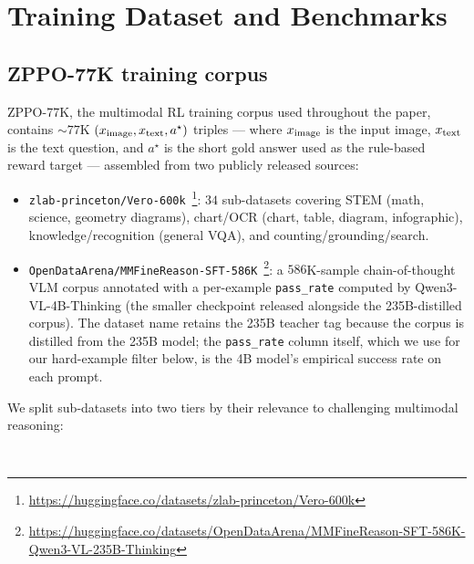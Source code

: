 \section{Training Dataset and Benchmarks}
\label{sec:appendix:dataset}

\subsection{ZPPO-77K training corpus}
\label{sec:appendix:dataset:corpus}

ZPPO-77K, the multimodal RL training corpus used throughout the paper, contains $\sim$$77$K $(x_{\rm image},x_{\rm text},a^{\star})$ triples --- where $x_{\rm image}$ is the input image, $x_{\rm text}$ is the text question, and $a^{\star}$ is the short gold answer used as the rule-based reward target --- assembled from two publicly released sources:
\begin{itemize}[leftmargin=12pt,topsep=2pt,itemsep=2pt]
    \item \texttt{zlab-princeton/Vero-600k}~\citep{sarch2026vero}\footnote{\url{https://huggingface.co/datasets/zlab-princeton/Vero-600k}}: $34$ sub-datasets covering STEM (math, science, geometry diagrams), chart/OCR (chart, table, diagram, infographic), knowledge/recognition (general VQA), and counting/grounding/search.
    \item \texttt{OpenDataArena/MMFineReason-SFT-586K}~\citep{lin2026mmfinereason}\footnote{\url{https://huggingface.co/datasets/OpenDataArena/MMFineReason-SFT-586K-Qwen3-VL-235B-Thinking}}: a $586$K-sample chain-of-thought VLM corpus annotated with a per-example \texttt{pass\_rate} computed by Qwen3-VL-4B-Thinking (the smaller checkpoint released alongside the 235B-distilled corpus). The dataset name retains the 235B teacher tag because the corpus is distilled from the 235B model; the \texttt{pass\_rate} column itself, which we use for our hard-example filter below, is the 4B model's empirical success rate on each prompt.
\end{itemize}
We split sub-datasets into two tiers by their relevance to challenging multimodal reasoning:
\begin{itemize}[leftmargin=12pt,topsep=2pt,itemsep=2pt]

\end{itemize}$$
